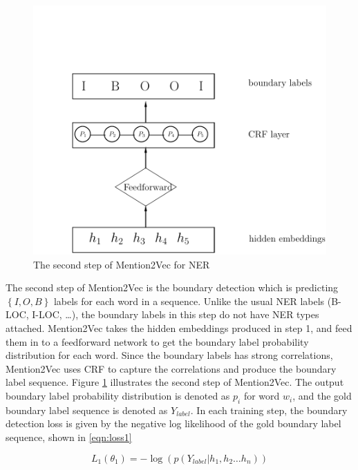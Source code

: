 \begin{figure}
  \centering
  \includegraphics[scale=0.6]{mention2vec2.pdf}
 \caption{The second step of Mention2Vec for NER}
  \label{fig:mention2vec2}
\end{figure}

The second step of Mention2Vec is the boundary detection which is predicting $\left\{I, O, B\right\}$ labels for each word in a sequence. Unlike the usual NER labels (B-LOC, I-LOC, \dots), the boundary labels in this step do not have NER types attached. Mention2Vec takes the hidden embeddings produced in step 1, and feed them in to a feedforward network to get the boundary label probability distribution for each word. Since the boundary labels has strong correlations, Mention2Vec uses CRF to capture the correlations and produce the boundary label sequence. Figure \ref{fig:mention2vec2} illustrates the second step of Mention2Vec. The output boundary label probability distribution is denoted as $p_{i}$ for word $w_{i}$, and the gold boundary label sequence is denoted as $Y_{label}$. In each training step, the boundary detection loss is given by the negative log likelihood of the gold boundary label sequence, shown in \ref{eqn:loss1}

\begin{equation}\label{eqn:loss1}
  L_{1}\left(\theta _{1}\right) =-\log \left( p\left( Y_{label}|h_{1}, h_{2} \dots h_{n}\right) \right) 
\end{equation}

